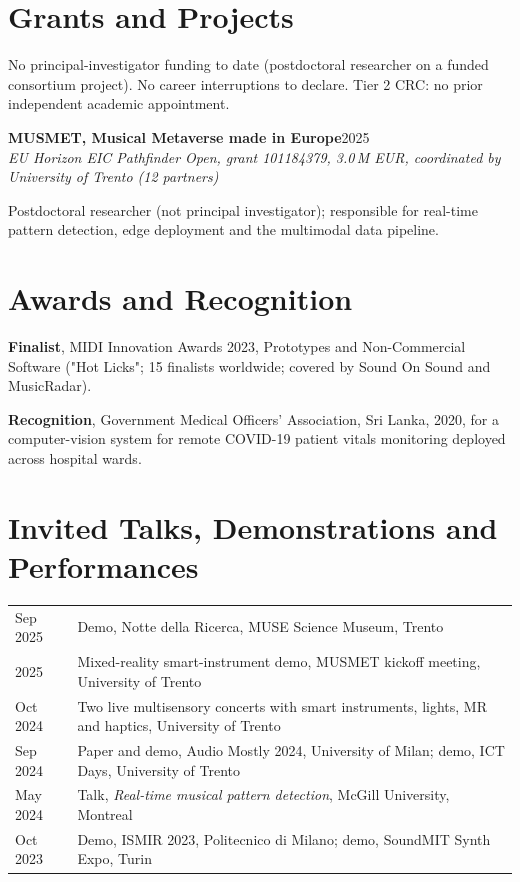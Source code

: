\documentclass[11pt]{article}
\newcommand{\entry}[3]{%
  \par\noindent\textbf{#1}\hfill #2\\
  \noindent\textit{#3}\par\vspace{0.15em}}
\begin{document}
\section*{Grants and Projects}
{\small No principal-investigator funding to date (postdoctoral researcher on a funded consortium project). No career interruptions to declare. Tier 2 CRC: no prior independent academic appointment.}\par
\entry{MUSMET, Musical Metaverse made in Europe}{2025}{EU Horizon EIC Pathfinder Open, grant 101184379, 3.0\,M EUR, coordinated by University of Trento (12 partners)}
\begin{cvlist}
  \item Postdoctoral researcher (not principal investigator); responsible for real-time pattern detection, edge deployment and the multimodal data pipeline.
\end{cvlist}

\section*{Awards and Recognition}
\begin{cvlist}
  \item \textbf{Finalist}, MIDI Innovation Awards 2023, Prototypes and Non-Commercial Software ("Hot Licks"; 15 finalists worldwide; covered by Sound On Sound and MusicRadar).
  \item \textbf{Recognition}, Government Medical Officers' Association, Sri Lanka, 2020, for a computer-vision system for remote COVID-19 patient vitals monitoring deployed across hospital wards.
\end{cvlist}

\section*{Invited Talks, Demonstrations and Performances}
\begin{tabularx}{\linewidth}{@{}l X@{}}
  Sep 2025 & Demo, Notte della Ricerca, MUSE Science Museum, Trento \\
  2025 & Mixed-reality smart-instrument demo, MUSMET kickoff meeting, University of Trento \\
  Oct 2024 & Two live multisensory concerts with smart instruments, lights, MR and haptics, University of Trento \\
  Sep 2024 & Paper and demo, Audio Mostly 2024, University of Milan; demo, ICT Days, University of Trento \\
  May 2024 & Talk, \textit{Real-time musical pattern detection}, McGill University, Montreal \\
  Oct 2023 & Demo, ISMIR 2023, Politecnico di Milano; demo, SoundMIT Synth Expo, Turin \\
\end{tabularx}
\end{document}

